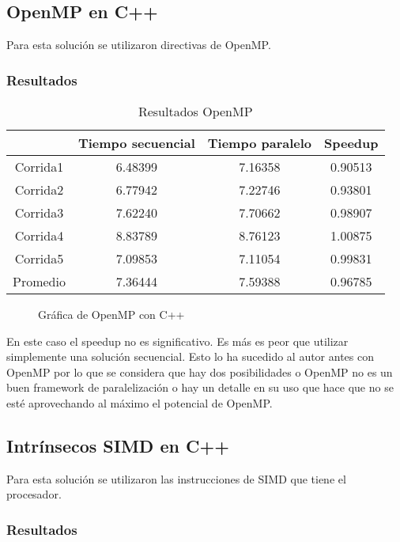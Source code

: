 \documentclass[10pt,letterpaper,oneside]{article}
\begin{document}
\subsection{OpenMP en C++}

Para esta solución se utilizaron directivas de OpenMP.

\subsubsection{Resultados}

\begin{table}[H]
	\centering
	\begin{tabular}{|c|c|c|c|}
		\hline
			& Tiempo secuencial & Tiempo paralelo & Speedup \\
		\hline
			Corrida1 & 6.48399 & 7.16358 & 0.90513 \\
			Corrida2 & 6.77942 & 7.22746 & 0.93801 \\
			Corrida3 & 7.62240 & 7.70662 & 0.98907 \\
			Corrida4 & 8.83789 & 8.76123 & 1.00875 \\
			Corrida5 & 7.09853 & 7.11054 & 0.99831 \\
		\hline
			Promedio & 7.36444 & 7.59388	 & 0.96785 \\
		\hline
	\end{tabular}
	\caption{Resultados OpenMP}
	\label{tab:openmp}
\end{table}

\begin{figure}[H]
	\centering
	\caption{Gráfica de OpenMP con C++}
	\label{fig:plot_openmp}	
\end{figure}

En este caso el speedup no es significativo. Es más es peor que utilizar simplemente una solución secuencial. Esto lo ha sucedido al autor antes con OpenMP por lo que se considera que hay dos posibilidades o OpenMP no es un buen framework de paralelización o hay un detalle en su uso que hace que no se esté aprovechando al máximo el potencial de OpenMP.

\subsection{Intrínsecos SIMD en C++}

Para esta solución se utilizaron las instrucciones de SIMD que tiene el procesador.

\subsubsection{Resultados}
\end{document}

